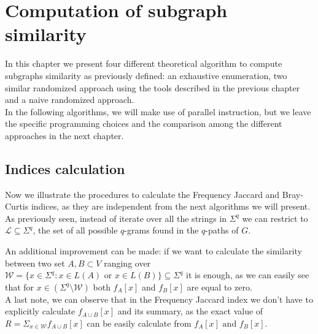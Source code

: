\chapter{Computation of subgraph similarity}

	In this chapter we present four different theoretical algorithm to compute subgraphs similarity as previously defined: an exhaustive enumeration, two similar randomized approach using the tools described in the previous chapter and a naive randomized approach.\\
	
	In the following algorithms, we will make use of parallel instruction, but we leave the specific programming choices and the comparison among the different approaches in the next chapter.
	
\section{Indices calculation}

Now we illustrate the procedures to calculate the Frequency Jaccard and Bray-Curtis indices, as they are independent from the next algorithms we will present.\\

As previously seen, instead of iterate over all the strings in $\Sigma^{q}$ we can restrict to $\mathcal{L} \subseteq \Sigma^{q}$, the set of all possible $q$-grams found in the $q$-paths of $G$. 

An additional improvement can be made: if we want to calculate the similarity between two set $A, B \subset V$ ranging over $\mathcal{W} = \{ x \in \Sigma^{q} : x \in L(A) \text{ or } x \in L(B) \} \subseteq \Sigma^{q}$ it is enough, as we can easily see that for $x \in ( \Sigma^{q} \setminus \mathcal{W} )$ both $f_A[x]$ and $f_B[x]$ are equal to zero.\\

A last note, we can observe that in the Frequency Jaccard index we don't have to explicitly calculate $f_{A \cup B}[x]$ and its summary, as the exact value of $R = \Sigma_{x \in \mathcal{W}} f_{A \cup B}[x]$ can be easily calculate from $f_{A}[x] \text{ and } f_{B}[x]$.\\

